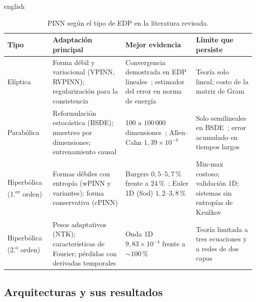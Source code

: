 \documentclass[../0000.tex]{subfiles}
\begin{document}
\begin{hyphenrules}{english}
\begin{table}[htbp]
\centering\small
\caption{PINN según el tipo de EDP en la literatura revisada.}
\label{tab:ea-tipos}
\begin{tabularx}{\textwidth}{@{}l Y Y Y@{}}
\toprule
Tipo & Adaptación principal & Mejor evidencia & Límite que persiste \\
\midrule
Elíptica & Forma débil y variacional (VPINN, RVPINN); regularización para la consistencia & Convergencia demostrada en EDP lineales~\cite{shin2020convergence,doumeche2025convergence}; estimador del error en norma de energía~\cite{rojas2024robust} & Teoría solo lineal; costo de la matriz de Gram~\cite{rojas2024robust} \\
Parabólica & Reformulación estocástica (BSDE); muestreo por dimensiones; entrenamiento causal & 100 a $100\,000$ dimensiones~\cite{han2018solving,hu2024tackling}; Allen--Cahn $1{,}39\times10^{-4}$~\cite{wang2022respecting} & Solo semilineales en BSDE~\cite{han2018solving}; error acumulado en tiempos largos~\cite{wang2022respecting} \\
Hiperbólica (1.\textsuperscript{er} orden) & Formas débiles con entropía (wPINN y variantes); forma conservativa (cPINN) & Burgers $0{,}5$--$5{,}7\,\%$ frente a $24\,\%$~\cite{de2024wpinns}; Euler 1D (Sod) $1{,}2$--$3{,}8\,\%$~\cite{chaumet2024improving} & Min-max costoso; validación 1D; sistemas sin entropías de Kružkov~\cite{de2024wpinns,chaumet2024improving} \\
Hiperbólica (2.\textsuperscript{o} orden) & Pesos adaptativos (NTK); características de Fourier; pérdidas con derivadas temporales & Onda 1D $9{,}83\times10^{-4}$ frente a ${\sim}100\,\%$~\cite{wang2021eigenvector} & Teoría limitada a tres ecuaciones y a redes de dos capas~\cite{qian2023error} \\
\bottomrule
\end{tabularx}
\end{table}

\subsection{Arquitecturas y sus resultados}
\label{subsec:ea-arq}


\end{hyphenrules}
\end{document}
